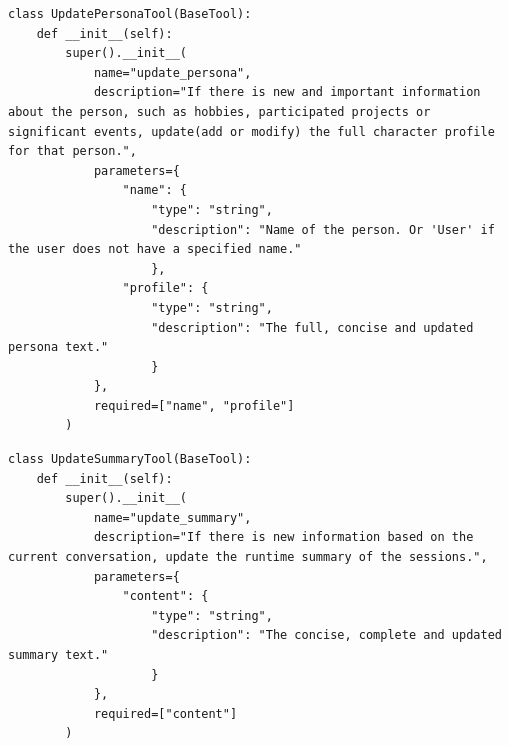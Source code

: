 \documentclass[11pt, a4paper]{lumia}
\begin{document}
\begin{tcolorbox}[title={UpdatePersonaTool}, sharp corners, breakable, 
      colframe=Periwinkle, colback=white, 
        boxrule=3pt, boxsep=0.5pt, enhanced, 
        shadow={3pt}{-3pt}{0pt}{opacity=1}]
        \footnotesize
        {\selectfont
\begin{lstlisting}[breaklines=true,showstringspaces=false]
class UpdatePersonaTool(BaseTool):
    def __init__(self):
        super().__init__(
            name="update_persona",
            description="If there is new and important information about the person, such as hobbies, participated projects or significant events, update(add or modify) the full character profile for that person.",
            parameters={
                "name": {
                    "type": "string", 
                    "description": "Name of the person. Or 'User' if the user does not have a specified name."
                    },
                "profile": {
                    "type": "string", 
                    "description": "The full, concise and updated persona text."
                    }
            },
            required=["name", "profile"]
        )
\end{lstlisting}
}
\end{tcolorbox}

\begin{tcolorbox}[title={UpdateSummaryTool}, sharp corners, breakable, 
      colframe=Periwinkle, colback=white, 
        boxrule=3pt, boxsep=0.5pt, enhanced, 
        shadow={3pt}{-3pt}{0pt}{opacity=1}]
        \footnotesize
        {\selectfont
\begin{lstlisting}[breaklines=true,showstringspaces=false]
class UpdateSummaryTool(BaseTool):
    def __init__(self):
        super().__init__(
            name="update_summary",
            description="If there is new information based on the current conversation, update the runtime summary of the sessions.",
            parameters={
                "content": {
                    "type": "string",
                    "description": "The concise, complete and updated summary text."
                    }
            },
            required=["content"]
        )
\end{lstlisting}
}
\end{tcolorbox}
\end{document}
